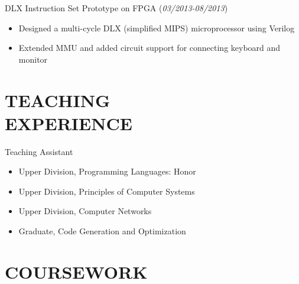 \documentclass[margin, 9pt]{res} %
\begin{document}
\begin{resume}
\vspace*{-7pt}
DLX Instruction Set Prototype on FPGA \hfill(\textit{03/2013-08/2013})\\
\vspace*{-10pt}
\begin{itemize}[leftmargin=*] \itemsep -3pt
\vspace*{-5pt}
	\item Designed a multi-cycle DLX (simplified MIPS) microprocessor using Verilog
	\item Extended MMU and added circuit support for connecting keyboard and monitor
\end{itemize}


\section{TEACHING\\ EXPERIENCE} 

{\large{Teaching Assistant}}\\
\vspace*{-5pt}
\begin{itemize}[leftmargin=*] \itemsep -2pt
\vspace*{-5pt}
	\item Upper Division, Programming Languages: Honor
	\item Upper Division, Principles of Computer Systems
	\item Upper Division, Computer Networks
	\item Graduate, Code Generation and Optimization
\end{itemize}


\section{COURSEWORK} 


\end{resume}
\end{document}
